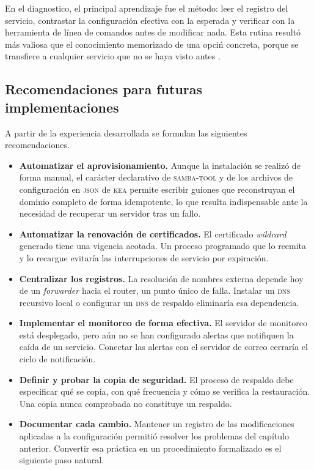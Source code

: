 En el diagnostico, el principal aprendizaje fue el m\'etodo: leer el
registro del servicio, contrastar la configuraci\'on efectiva con la
esperada y verificar con la herramienta de l\'inea de comandos antes de
modificar nada. Esta rutina result\'o m\'as valiosa que el conocimiento
memorizado de una opci\'n concreta, porque se transfiere a cualquier
servicio que no se haya visto antes \cite{salz2020}.

\subsection{Recomendaciones para futuras implementaciones}

A partir de la experiencia desarrollada se formulan las siguientes
recomendaciones.

\begin{itemize}
  \item \textbf{Automatizar el aprovisionamiento.} Aunque la
        instalaci\'on se realiz\'o de forma manual, el car\'acter
        declarativo de \textsc{samba-tool} y de los archivos de configuraci\'on
        en \textsc{json} de \textsc{kea} permite escribir guiones que
        reconstruyan el dominio completo de forma idempotente, lo que
        resulta indispensable ante la necesidad de recuperar un servidor
        tras un fallo.
  \item \textbf{Automatizar la renovaci\'on de certificados.} El
        certificado \textit{wildcard} generado tiene una vigencia
        acotada. Un proceso programado que lo reemita y lo recargue
        evitar\'ia las interrupciones de servicio por expiraci\'on.
  \item \textbf{Centralizar los registros.} La resoluci\'on de nombres
        externa depende hoy de un \textit{forwarder} hacia el router, un
        punto \'unico de falla. Instalar un \textsc{dns} recursivo local o
        configurar un \textsc{dns} de respaldo eliminar\'ia esa
        dependencia.
  \item \textbf{Implementar el monitoreo de forma efectiva.} El servidor de
        monitoreo est\'a desplegado, pero a\'un no se han configurado
        alertas que notifiquen la ca\'ida de un servicio. Conectar las
        alertas con el servidor de correo cerrar\'ia el ciclo de
        notificaci\'on.
  \item \textbf{Definir y probar la copia de seguridad.} El proceso de
        respaldo debe especificar qu\'e se copia, con qu\'e frecuencia y c\'omo
        se verifica la restauraci\'on. Una copia nunca comprobada no
        constituye un respaldo.
  \item \textbf{Documentar cada cambio.} Mantener un registro de las
        modificaciones aplicadas a la configuraci\'on permiti\'o resolver
        los problemas del cap\'itulo anterior. Convertir esa pr\'actica en
        un procedimiento formalizado es el siguiente paso natural.
\end{itemize}
